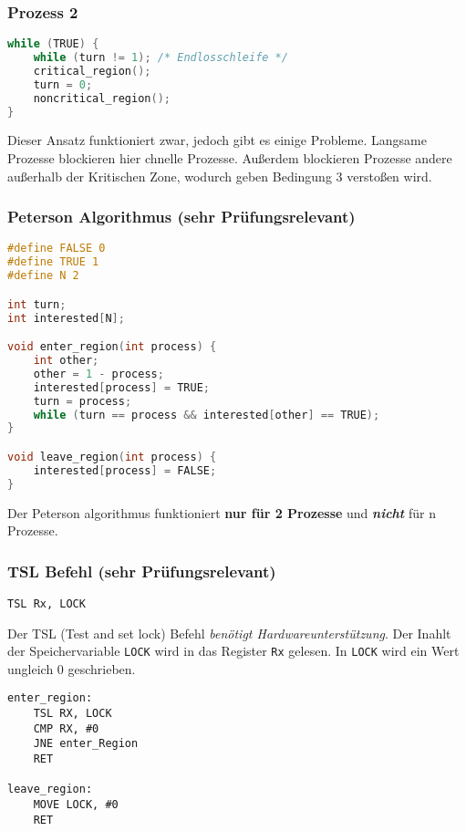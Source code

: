 \subsubsection*{Prozess 2}

\begin{lstlisting}[language=C]
while (TRUE) {
    while (turn != 1); /* Endlosschleife */
    critical_region();
    turn = 0;
    noncritical_region();
} 
\end{lstlisting}

Dieser Ansatz funktioniert zwar, jedoch gibt es einige Probleme. Langsame Prozesse blockieren hier chnelle Prozesse. Außerdem blockieren Prozesse andere außerhalb der Kritischen Zone, wodurch geben Bedingung 3 verstoßen wird.

\subsubsection{Peterson Algorithmus (sehr Prüfungsrelevant)}

\begin{lstlisting}[language=C]
#define FALSE 0
#define TRUE 1
#define N 2

int turn;
int interested[N];

void enter_region(int process) {
    int other;
    other = 1 - process;
    interested[process] = TRUE;
    turn = process;
    while (turn == process && interested[other] == TRUE);
} 

void leave_region(int process) {
    interested[process] = FALSE;
} 
\end{lstlisting}

Der Peterson algorithmus funktioniert \textbf{nur für 2 Prozesse} und \textbf{\textit{nicht}} für n Prozesse. 

\subsubsection{TSL Befehl (sehr Prüfungsrelevant)}

\lstinline{TSL Rx, LOCK}

Der TSL (Test and set lock) Befehl \textit{benötigt Hardwareunterstützung}. Der Inahlt der Speichervariable \texttt{LOCK} wird in das Register \texttt{Rx} gelesen. In \texttt{LOCK} wird ein Wert ungleich 0 geschrieben.

\begin{lstlisting}[language={[x86masm]Assembler}]
enter_region:
    TSL RX, LOCK
    CMP RX, #0
    JNE enter_Region
    RET
    
leave_region:
    MOVE LOCK, #0
    RET 
\end{lstlisting}

